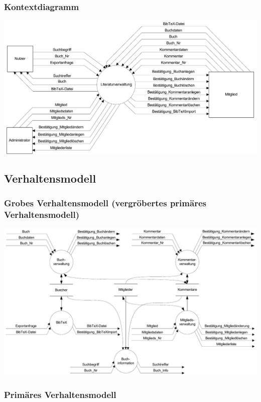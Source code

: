 \newpage %
\subsubsection{Kontextdiagramm}

\includegraphics[scale=0.75]{kontextdiagramm}

\subsection{Verhaltensmodell}
\subsubsection{Grobes Verhaltensmodell (vergröbertes primäres Verhaltensmodell)}
\includegraphics[scale=0.70]{grobes_verhaltensmodell}

\subsubsection{Primäres Verhaltensmodell}
